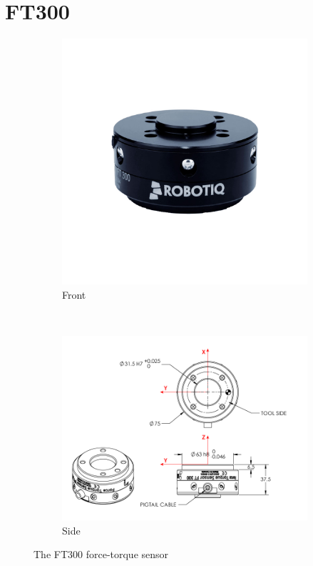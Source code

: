 \documentclass[times, utf8, diplomski, english]{fer}
\begin{document}
\section{FT300}
\begin{figure}[t!]
    \centering
        \begin{subfigure}[h,t]{0.34\textwidth}
        \includegraphics[clip, trim=0cm 5cm 0cm 5cm, width=\textwidth]{FT300_pic}
        \caption{Front}
    \end{subfigure}
    ~
    \begin{subfigure}[h,t]{0.34\textwidth}
        \includegraphics[width=\textwidth]{FT300}
        \caption{Side}
    \end{subfigure}
    \caption{The FT300 force-torque sensor}\label{fig:FT300}
\end{figure}
\end{document}
